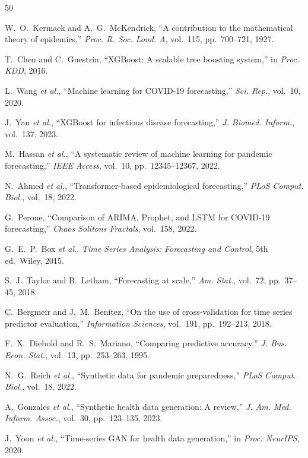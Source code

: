 \documentclass{ieeeaccess}
\begin{document}
\begin{thebibliography}{50}

W.~O.~Kermack and A.~G.~McKendrick, ``A contribution to the mathematical theory of epidemics,'' \textit{Proc. R. Soc. Lond. A}, vol.~115, pp.~700--721, 1927.

T.~Chen and C.~Guestrin, ``XGBoost: A scalable tree boosting system,'' in \textit{Proc. KDD}, 2016.

L.~Wang \textit{et al.}, ``Machine learning for COVID-19 forecasting,'' \textit{Sci. Rep.}, vol.~10, 2020.

J.~Yan \textit{et al.}, ``XGBoost for infectious disease forecasting,'' \textit{J. Biomed. Inform.}, vol.~137, 2023.

M.~Hassan \textit{et al.}, ``A systematic review of machine learning for pandemic forecasting,'' \textit{IEEE Access}, vol.~10, pp.~12345--12367, 2022.

N.~Ahmed \textit{et al.}, ``Transformer-based epidemiological forecasting,'' \textit{PLoS Comput. Biol.}, vol.~18, 2022.

G.~Perone, ``Comparison of ARIMA, Prophet, and LSTM for COVID-19 forecasting,'' \textit{Chaos Solitons Fractals}, vol.~158, 2022.

G.~E.~P.~Box \textit{et al.}, \textit{Time Series Analysis: Forecasting and Control}, 5th ed.\ Wiley, 2015.

S.~J.~Taylor and B.~Letham, ``Forecasting at scale,'' \textit{Am. Stat.}, vol.~72, pp.~37--45, 2018.

C.~Bergmeir and J.~M.~Ben\'itez, ``On the use of cross-validation for time series predictor evaluation,'' \textit{Information Sciences}, vol.~191, pp.~192--213, 2018.

F.~X.~Diebold and R.~S.~Mariano, ``Comparing predictive accuracy,'' \textit{J. Bus. Econ. Stat.}, vol.~13, pp.~253--263, 1995.

N.~G.~Reich \textit{et al.}, ``Synthetic data for pandemic preparedness,'' \textit{PLoS Comput. Biol.}, vol.~18, 2022.

A.~Gonzales \textit{et al.}, ``Synthetic health data generation: A review,'' \textit{J. Am. Med. Inform. Assoc.}, vol.~30, pp.~123--135, 2023.

J.~Yoon \textit{et al.}, ``Time-series GAN for health data generation,'' in \textit{Proc. NeurIPS}, 2020.


\end{thebibliography}
\end{document}
